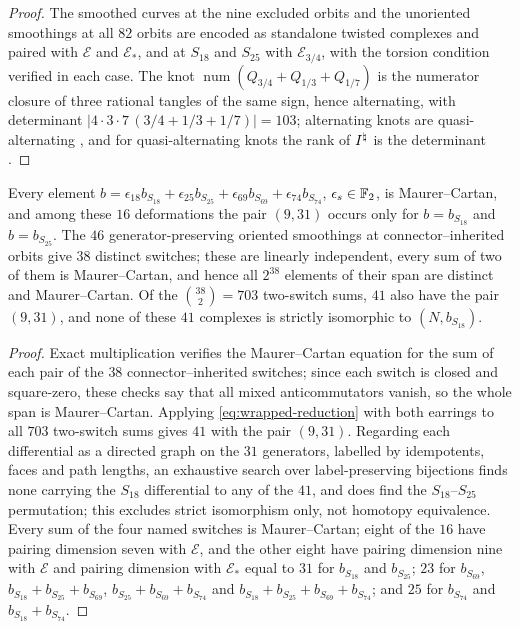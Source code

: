 \begin{proof}
The smoothed curves at the nine excluded orbits and the
unoriented smoothings at all $82$ orbits are encoded as standalone twisted complexes and paired with
$\mathcal E$ and $\mathcal E_*$, and at $S_{18}$ and $S_{25}$ with $\mathcal E_{3/4}$, with the
torsion condition verified in each case.  The knot $\operatorname{num}(Q_{3/4}+Q_{1/3}+Q_{1/7})$ is the
numerator closure of three rational tangles of the same sign, hence alternating, with determinant
$|4\cdot3\cdot7\,(3/4+1/3+1/7)|=103$; alternating knots are quasi-alternating \cite[Lemma~3.2]{OSbranched}, and for
quasi-alternating knots the rank of $I^{\natural}$ is the determinant \cite[Cor.~1.6]{KM2}.
\end{proof}

\begin{proposition}\label{prop:aux-span}
Every element $b=\epsilon_{18}b_{S_{18}}+\epsilon_{25}b_{S_{25}}+\epsilon_{69}b_{S_{69}}
+\epsilon_{74}b_{S_{74}}$, $\epsilon_s\in\mathbb{F}_2$, is Maurer--Cartan, and among these $16$ deformations
the pair $(9,31)$ occurs only for $b=b_{S_{18}}$ and $b=b_{S_{25}}$.  The $46$ generator-preserving
oriented smoothings at connector--inherited orbits give $38$ distinct switches; these are linearly
independent, every sum of two of them is Maurer--Cartan, and hence all $2^{38}$ elements of their span are
distinct and Maurer--Cartan.  Of the $\binom{38}{2}=703$ two-switch sums, $41$ also have the pair $(9,31)$,
and none of these $41$ complexes is strictly isomorphic to $(N,b_{S_{18}})$.
\end{proposition}

\begin{proof}
Exact multiplication verifies the Maurer--Cartan equation for the
sum of each pair of the $38$ connector--inherited switches; since each switch is closed and square-zero,
these checks say that all mixed anticommutators vanish, so the whole span is Maurer--Cartan.  Applying
\eqref{eq:wrapped-reduction} with both earrings to all $703$ two-switch sums gives $41$ with the pair
$(9,31)$.  Regarding each differential as a directed graph on the $31$ generators, labelled by idempotents,
faces and path lengths, an exhaustive search over label-preserving bijections finds none carrying the
$S_{18}$ differential to any of the $41$, and does find the $S_{18}$--$S_{25}$ permutation; this excludes
strict isomorphism only, not homotopy equivalence.  Every sum of the four named switches is
Maurer--Cartan; eight of the $16$ have pairing dimension seven with $\mathcal E$, and the other eight have
pairing dimension nine with $\mathcal E$ and pairing dimension with $\mathcal E_*$ equal to $31$ for
$b_{S_{18}}$ and $b_{S_{25}}$; $23$ for $b_{S_{69}}$, $b_{S_{18}}+b_{S_{25}}+b_{S_{69}}$,
$b_{S_{25}}+b_{S_{69}}+b_{S_{74}}$ and $b_{S_{18}}+b_{S_{25}}+b_{S_{69}}+b_{S_{74}}$; and $25$ for
$b_{S_{74}}$ and $b_{S_{18}}+b_{S_{74}}$.
\end{proof}

